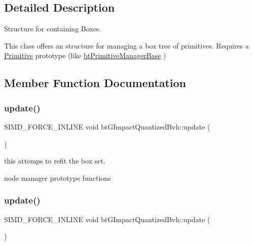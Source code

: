 \subsection{Detailed Description}
Structure for containing Boxes. 

This class offers an structure for managing a box tree of primitives. Requires a \hyperlink{classPrimitive}{Primitive} prototype (like \hyperlink{classbtPrimitiveManagerBase}{bt\+Primitive\+Manager\+Base} ) 

\subsection{Member Function Documentation}
\mbox{\label{classbtGImpactQuantizedBvh_a71665f5245b8f7de1c54f107ef262cd0}} 
\subsubsection{\texorpdfstring{update()}{update()}\hspace{0.1cm}{\footnotesize\ttfamily [1/2]}}
{\footnotesize\ttfamily S\+I\+M\+D\+\_\+\+F\+O\+R\+C\+E\+\_\+\+I\+N\+L\+I\+NE void bt\+G\+Impact\+Quantized\+Bvh\+::update (\begin{DoxyParamCaption}{ }\end{DoxyParamCaption})\hspace{0.3cm}{\ttfamily [inline]}}



this attemps to refit the box set. 

node manager prototype functions \mbox{\label{classbtGImpactQuantizedBvh_a71665f5245b8f7de1c54f107ef262cd0}} 
\subsubsection{\texorpdfstring{update()}{update()}\hspace{0.1cm}{\footnotesize\ttfamily [2/2]}}
{\footnotesize\ttfamily S\+I\+M\+D\+\_\+\+F\+O\+R\+C\+E\+\_\+\+I\+N\+L\+I\+NE void bt\+G\+Impact\+Quantized\+Bvh\+::update (\begin{DoxyParamCaption}{ }\end{DoxyParamCaption})\hspace{0.3cm}{\ttfamily [inline]}}




